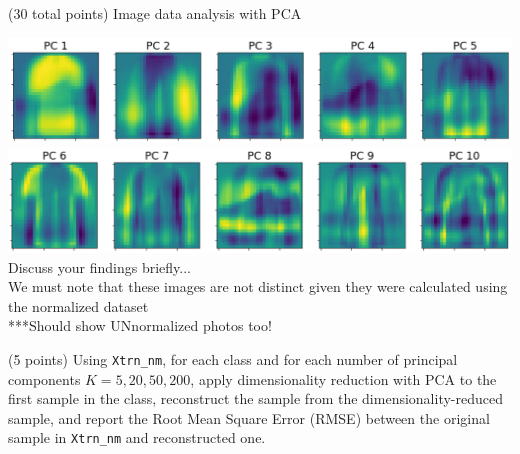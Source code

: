 \documentclass[12pt]{article}
\begin{document}
\begin{question}{(30 total points) Image data analysis with PCA}
\begin{subquestion}
      \begin{answerbox}{35em}
         \includegraphics[width=1\textwidth]{images/q151.png}
         \includegraphics[width=1\textwidth]{images/q152.png}
        Discuss your findings briefly...\\
        We must note that these images are not distinct given they were calculated using the normalized dataset\\
        ***Should show UNnormalized photos too!
      \end{answerbox}
  


   \end{subquestion}

   \begin{subquestion}{(5 points)
       Using \texttt{Xtrn\_nm}, 
       for each class and for each number of principal components $K =
       5, 20, 50, 200$, apply dimensionality reduction with PCA to the
       first sample in the class, reconstruct the sample from the
       dimensionality-reduced sample, and 
       report the Root Mean Square Error (RMSE) between the
       original sample in {\tt Xtrn\_nm} and reconstructed one.
     } \label{Q1.6}

     


\end{subquestion}
\end{question}
\end{document}

